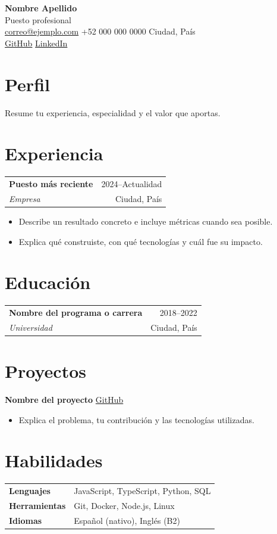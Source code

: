 \documentclass[11pt,a4paper]{article}
\makeatletter
\newcommand{\entry}[4]{%
  \begin{tabularx}{\linewidth}{@{}Xr@{}}
    \textbf{#1} & \textcolor{muted}{#2} \\
    \textit{#3} & \textcolor{muted}{#4}
  \end{tabularx}\vspace{0.25em}
}
\makeatother
\begin{document}
\begin{center}
  {\Huge\bfseries Nombre Apellido}\\[0.35em]
  {\large\color{accent}Puesto profesional}\\[0.6em]
  \href{mailto:correo@ejemplo.com}{correo@ejemplo.com}
  \quad\textcolor{accent}{\textbullet}\quad +52 000 000 0000
  \quad\textcolor{accent}{\textbullet}\quad Ciudad, País\\[0.25em]
  \href{https://github.com/usuario}{GitHub}
  \quad\textcolor{accent}{\textbullet}\quad
  \href{https://linkedin.com/in/usuario}{LinkedIn}
\end{center}

\section{Perfil}
Resume tu experiencia, especialidad y el valor que aportas.

\section{Experiencia}
\entry{Puesto más reciente}{2024--Actualidad}{Empresa}{Ciudad, País}
\begin{itemize}
  \item Describe un resultado concreto e incluye métricas cuando sea posible.
  \item Explica qué construiste, con qué tecnologías y cuál fue su impacto.
\end{itemize}

\section{Educación}
\entry{Nombre del programa o carrera}{2018--2022}{Universidad}{Ciudad, País}

\section{Proyectos}
\textbf{Nombre del proyecto} \hfill \href{https://github.com/usuario}{GitHub}
\begin{itemize}
  \item Explica el problema, tu contribución y las tecnologías utilizadas.
\end{itemize}

\section{Habilidades}
\begin{tabularx}{\linewidth}{@{}>{\bfseries}l X@{}}
  Lenguajes    & JavaScript, TypeScript, Python, SQL \\
  Herramientas & Git, Docker, Node.js, Linux \\
  Idiomas      & Español (nativo), Inglés (B2)
\end{tabularx}
\end{document}
